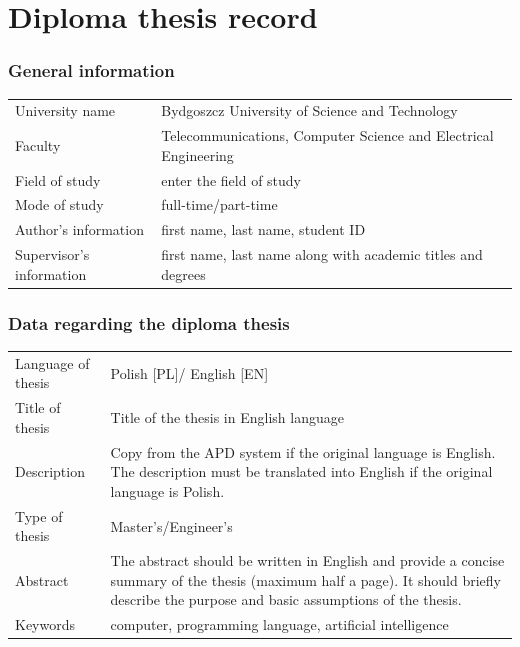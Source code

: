 \newpage
\section*{Diploma thesis record}
\subsubsection*{General information}
\begin{tabular}{p{3cm}p{12cm}}
University name & Bydgoszcz University of Science and Technology\\
Faculty &  Telecommunications, Computer  Science  
and Electrical Engineering\\
Field of study & enter the field of study \\
Mode of study & full-time/part-time \\
Author's information & first name, last name, student ID \\
Supervisor's information & first name, last name along with academic titles and degrees \\
\end{tabular}

\subsubsection*{Data regarding the diploma thesis}
\begin{tabular}{p{3cm}p{12cm}}
Language of thesis & Polish [PL]/ English [EN] \\
Title of thesis & Title of the thesis in English language \\
Description  & Copy from the APD system if the original language is English. The description must be translated into English if the original language is Polish.\\
Type of thesis & Master's/Engineer’s \\
Abstract & The abstract should be written in English and provide a concise summary of the thesis (maximum half a page). It should briefly describe the purpose and basic assumptions of the thesis. \\
Keywords & computer, programming language, artificial intelligence \\
\end{tabular}


